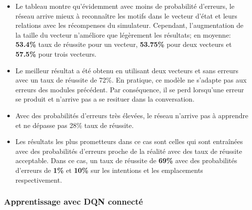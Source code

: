 \begin{itemize}
	\item Le tableau montre qu'évidemment avec moins de probabilité d'erreurs, le réseau arrive mieux à reconnaître les motifs dans le vecteur d'état et leurs relations avec les récompenses du simulateur. Cependant, l'augmentation de la taille du vecteur n'améliore que légèrement les résultats; en moyenne: \textbf{53.4\%} taux de réussite pour un vecteur, \textbf{53.75\%} pour deux vecteurs et \textbf{57.5\%} pour trois vecteurs.
	\item Le meilleur résultat a été obtenu en utilisant deux vecteurs et sans erreurs avec un taux de réussite de 72\%. En pratique, ce modèle ne s'adapte pas aux erreurs des modules précédent. Par conséquence, il se perd lorsqu'une erreur se produit et n'arrive pas a se resituer dans la conversation.
	\item Avec des probabilités d'erreurs très élevées, le réseau n'arrive pas à apprendre et ne dépasse pas 28\% taux de réussite.
	\item Les résultats les plus prometteurs dans ce cas sont celles qui sont entraînées avec des probabilités d'erreurs proche de la réalité avec des taux de réussite acceptable. Dans ce cas, un taux de réussite de \textbf{69\%} avec des probabilités d'erreurs de \textbf{1\%} et \textbf{10\%} sur les intentions et les emplacements respectivement.
\end{itemize}

\subsubsection{Apprentissage avec DQN connecté}
